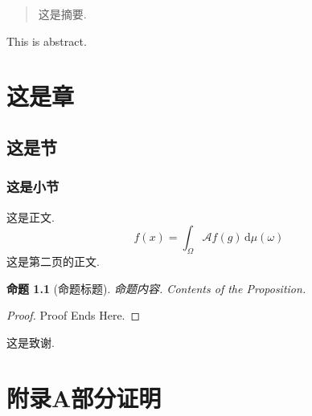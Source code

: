 \documentclass[oneside]{fdmthesis2023}
\theoremstyle{definition}
\theoremstyle{plain}
\newtheorem{proposition}[definition]{命题}
\theoremstyle{remark}
\begin{document}
  \frontmatter
    \begin{abstract}
      这是摘要.
    \end{abstract}

    \begin{abstract*}
      This is abstract.
    \end{abstract*}

    \maketitle
    \tableofcontents

  \mainmatter
    \chapter{这是章}
      \section{这是节}
        \subsection{这是小节}
          这是正文. \cite{key}
          $$
            f(x)=\int_{\Omega}\mathscr{A}f(g)\,\mathrm{d}\mu(\omega)
          $$
          \newpage
          这是第二页的正文.
          \begin{proposition}[命题标题]\kaiti
            命题内容. Contents of the Proposition.
          \end{proposition}
          \begin{proof}
            Proof Ends Here.
          \end{proof}

  \backmatter
    \begin{acknowledgement}
      这是致谢.
    \end{acknowledgement}

      
      

    \chapter*{附录A\quad 部分证明}
\end{document}
